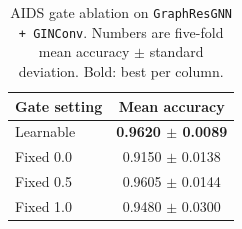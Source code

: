 \begin{table}[t]
\centering
\footnotesize
\caption{AIDS gate ablation on \texttt{GraphResGNN + GINConv}. Numbers are five-fold mean accuracy $\pm$ standard deviation. Bold: best per column.}
\label{tab:aids_gate_ablation}
\begin{tabular}{lc}
\toprule
Gate setting & Mean accuracy \\
\midrule
Learnable & \textbf{0.9620 $\pm$ 0.0089} \\
Fixed 0.0 & 0.9150 $\pm$ 0.0138 \\
Fixed 0.5 & 0.9605 $\pm$ 0.0144 \\
Fixed 1.0 & 0.9480 $\pm$ 0.0300 \\
\bottomrule
\end{tabular}
\end{table}
